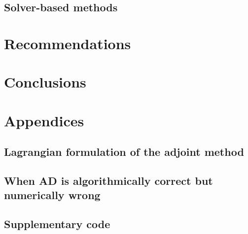 \documentclass[12pt]{article}
\begin{document}
\subsection{Solver-based methods}
\label{section:solver-methods}



\section{Recommendations}


\section{Conclusions}


% 

\newpage
\appendix
\section*{Appendices}
\renewcommand{\thesubsection}{\Alph{subsection}}

% 
\subsection{Lagrangian formulation of the adjoint method}

\newpage
\subsection{When AD is algorithmically correct but numerically wrong}

\newpage
\subsection{Supplementary code}



\newpage

\printbibliography[heading=bibintoc, title={References}]
\end{document}
